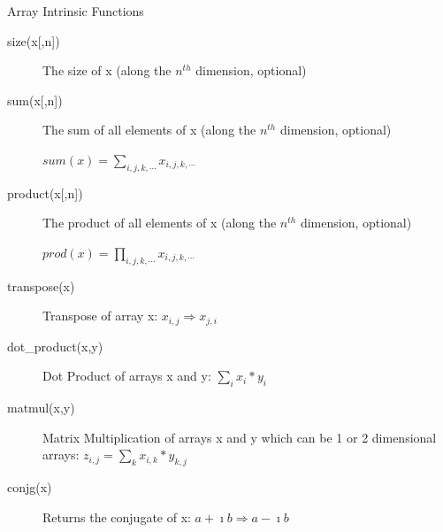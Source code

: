 \documentclass[10pt,t]{beamer}
\begin{document}
\begin{frame}{Array Intrinsic Functions}
  \footnotesize
  \begin{description}
    \item[{size(x[,n])}] The size of x (along the $n^{th}$ dimension, optional)
    \item[{sum(x[,n])}] The sum of all elements of x (along the $n^{th}$ dimension, optional)
    \item[] $sum(x) = \sum_{i,j,k,\cdots}x_{i,j,k,\cdots}$
    \item[{product(x[,n])}] The product of all elements of x (along the $n^{th}$ dimension, optional)
    \item[] $prod(x) = \prod_{i,j,k,\cdots}x_{i,j,k,\cdots}$
    \item[transpose(x)] Transpose of array x: $ x_{i,j}\Rightarrow x_{j,i}$
    \item[dot\_product(x,y)] Dot Product of arrays x and y: $ \sum_{i} x_i* y_i $
    \item[matmul(x,y)] Matrix Multiplication of arrays x and y which can be 1 or 2 dimensional arrays: $ z_{i,j} = \sum_k x_{i,k} * y_{k,j}$
    \item[conjg(x)] Returns the conjugate of x: $ a + \imath b \Rightarrow a - \imath b$
  \end{description}
\end{frame}
\end{document}
